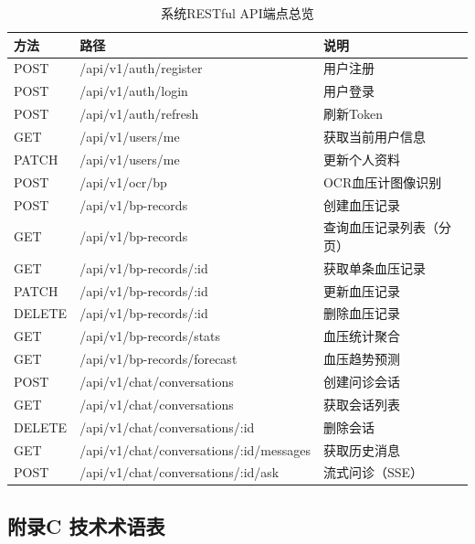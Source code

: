 \documentclass[zihao=-4,a4paper]{ctexart}
\begin{document}
\begin{table}[H]
\centering
\caption{系统RESTful API端点总览}
\label{tab:api-list}
\begin{tabular}{lll}
\toprule
\textbf{方法} & \textbf{路径} & \textbf{说明} \\
\midrule
POST & /api/v1/auth/register & 用户注册 \\
POST & /api/v1/auth/login & 用户登录 \\
POST & /api/v1/auth/refresh & 刷新Token \\
GET  & /api/v1/users/me & 获取当前用户信息 \\
PATCH & /api/v1/users/me & 更新个人资料 \\
POST & /api/v1/ocr/bp & OCR血压计图像识别 \\
POST & /api/v1/bp-records & 创建血压记录 \\
GET  & /api/v1/bp-records & 查询血压记录列表（分页） \\
GET  & /api/v1/bp-records/:id & 获取单条血压记录 \\
PATCH & /api/v1/bp-records/:id & 更新血压记录 \\
DELETE & /api/v1/bp-records/:id & 删除血压记录 \\
GET  & /api/v1/bp-records/stats & 血压统计聚合 \\
GET  & /api/v1/bp-records/forecast & 血压趋势预测 \\
POST & /api/v1/chat/conversations & 创建问诊会话 \\
GET  & /api/v1/chat/conversations & 获取会话列表 \\
DELETE & /api/v1/chat/conversations/:id & 删除会话 \\
GET  & /api/v1/chat/conversations/:id/messages & 获取历史消息 \\
POST & /api/v1/chat/conversations/:id/ask & 流式问诊（SSE） \\
\bottomrule
\end{tabular}
\end{table}

\subsection*{附录C 技术术语表}
\end{document}
